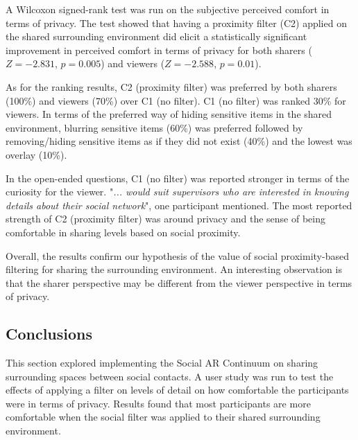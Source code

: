 A Wilcoxon signed-rank test was run on the subjective perceived comfort in terms of privacy. The test showed that having a proximity filter (C2) applied on the shared surrounding environment did elicit a statistically significant improvement in perceived comfort in terms of privacy for both sharers ($Z=-2.831$, $p=0.005$) and viewers ($Z=-2.588$, $p=0.01$). 

As for the ranking results, C2 (proximity filter) was preferred by both sharers (100\%) and viewers (70\%) over C1 (no filter). C1 (no filter) was ranked 30\% for viewers. In terms of the preferred way of hiding sensitive items in the shared environment, blurring sensitive items (60\%) was preferred followed by removing/hiding sensitive items as if they did not exist (40\%) and the lowest was overlay (10\%). 

In the open-ended questions, C1 (no filter) was reported stronger in terms of the curiosity for the viewer. "\textit{... would suit supervisors who are interested in knowing details about their social network}", one participant mentioned. The most reported strength of C2 (proximity filter) was around privacy and the sense of being comfortable in sharing levels based on social proximity. 

Overall, the results confirm our hypothesis of the value of social proximity-based filtering for sharing the surrounding environment. An interesting observation is that the sharer perspective may be different from the viewer perspective in terms of privacy. 


\subsection{Conclusions}

This section explored implementing the Social AR Continuum on sharing surrounding spaces between social contacts. A user study was run to test the effects of applying a filter on levels of detail on how comfortable the participants were in terms of privacy. Results found that most participants are more comfortable when the social filter was applied to their shared surrounding environment. 